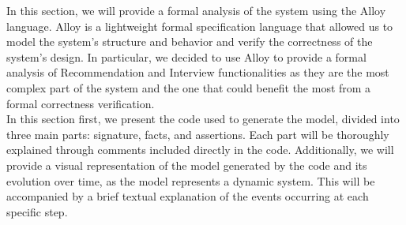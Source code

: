 In this section, we will provide a formal analysis of the system using the Alloy language. Alloy is a lightweight formal specification language that allowed us to model the system's structure and behavior and verify the correctness of the system's design. In particular, we decided to use Alloy to provide a formal analysis of Recommendation and Interview functionalities as they are the most complex part of the system and the one that could benefit the most from a formal correctness verification.\\
In this section first, we present the code used to generate the model, divided into three main parts: signature, facts, and assertions. Each part will be thoroughly explained through comments included directly in the code. Additionally, we will provide a visual representation of the model generated by the code and its evolution over time, as the model represents a dynamic system. This will be accompanied by a brief textual explanation of the events occurring at each specific step.\\


